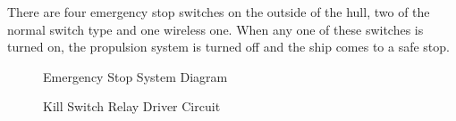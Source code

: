 \documentclass[lettersize,journal]{IEEEtran}
\begin{document}
There are four emergency stop switches on the outside of the hull, two of the normal switch type and one wireless one.
When any one of these switches is turned on, the propulsion system is turned off and the ship comes to a safe stop.

\begin{figure}[H]
    \begin{center}
    \end{center}
    \caption{Emergency Stop System Diagram}
    \label{fig:emergency_stop_system_diagram}
\end{figure}


\begin{figure}[H]
    \begin{center}
    \end{center}
    \caption{Kill Switch Relay Driver Circuit}
    \label{fig:kill_switch_relay_driver_circuit}
\end{figure}
\end{document}
